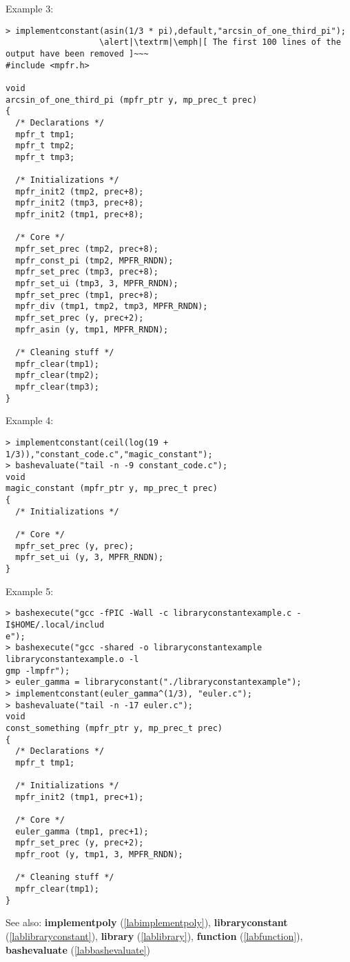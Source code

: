 \noindent Example 3: 
\begin{center}\begin{minipage}{15cm}\begin{Verbatim}[frame=single,commandchars=\\\|\~]
> implementconstant(asin(1/3 * pi),default,"arcsin_of_one_third_pi"); 
                   \alert|\textrm|\emph|[ The first 100 lines of the output have been removed ]~~~
#include <mpfr.h>

void
arcsin_of_one_third_pi (mpfr_ptr y, mp_prec_t prec)
{
  /* Declarations */
  mpfr_t tmp1;
  mpfr_t tmp2;
  mpfr_t tmp3;

  /* Initializations */
  mpfr_init2 (tmp2, prec+8);
  mpfr_init2 (tmp3, prec+8);
  mpfr_init2 (tmp1, prec+8);

  /* Core */
  mpfr_set_prec (tmp2, prec+8);
  mpfr_const_pi (tmp2, MPFR_RNDN);
  mpfr_set_prec (tmp3, prec+8);
  mpfr_set_ui (tmp3, 3, MPFR_RNDN);
  mpfr_set_prec (tmp1, prec+8);
  mpfr_div (tmp1, tmp2, tmp3, MPFR_RNDN);
  mpfr_set_prec (y, prec+2);
  mpfr_asin (y, tmp1, MPFR_RNDN);

  /* Cleaning stuff */
  mpfr_clear(tmp1);
  mpfr_clear(tmp2);
  mpfr_clear(tmp3);
}
\end{Verbatim}
\end{minipage}\end{center}
\noindent Example 4: 
\begin{center}\begin{minipage}{15cm}\begin{Verbatim}[frame=single,commandchars=\\\|\~]
> implementconstant(ceil(log(19 + 1/3)),"constant_code.c","magic_constant");
> bashevaluate("tail -n -9 constant_code.c");
void
magic_constant (mpfr_ptr y, mp_prec_t prec)
{
  /* Initializations */

  /* Core */
  mpfr_set_prec (y, prec);
  mpfr_set_ui (y, 3, MPFR_RNDN);
}
\end{Verbatim}
\end{minipage}\end{center}
\noindent Example 5: 
\begin{center}\begin{minipage}{15cm}\begin{Verbatim}[frame=single,commandchars=\\\|\~]
> bashexecute("gcc -fPIC -Wall -c libraryconstantexample.c -I$HOME/.local/includ
e");
> bashexecute("gcc -shared -o libraryconstantexample libraryconstantexample.o -l
gmp -lmpfr");
> euler_gamma = libraryconstant("./libraryconstantexample");
> implementconstant(euler_gamma^(1/3), "euler.c");
> bashevaluate("tail -n -17 euler.c");
void
const_something (mpfr_ptr y, mp_prec_t prec)
{
  /* Declarations */
  mpfr_t tmp1;

  /* Initializations */
  mpfr_init2 (tmp1, prec+1);

  /* Core */
  euler_gamma (tmp1, prec+1);
  mpfr_set_prec (y, prec+2);
  mpfr_root (y, tmp1, 3, MPFR_RNDN);

  /* Cleaning stuff */
  mpfr_clear(tmp1);
}
\end{Verbatim}
\end{minipage}\end{center}
See also: \textbf{implementpoly} (\ref{labimplementpoly}), \textbf{libraryconstant} (\ref{lablibraryconstant}), \textbf{library} (\ref{lablibrary}), \textbf{function} (\ref{labfunction}), \textbf{bashevaluate} (\ref{labbashevaluate})
